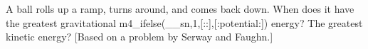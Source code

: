 A ball rolls up a ramp, turns around, and comes back
down. When does it have the greatest gravitational m4_ifelse(__sn,1,[::],[:potential:])
energy? The greatest kinetic energy? [Based on a problem
by Serway and Faughn.]
